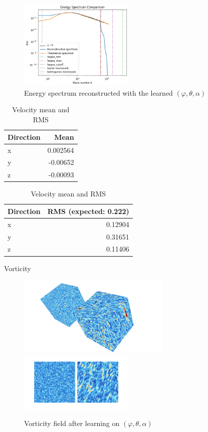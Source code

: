 \documentclass[11pt]{beamer}
\begin{document}
\begin{frame}
  \begin{figure}
    \centering
    \includegraphics[width=0.49\textwidth]{illustrations/EnergySpectrumTrained.png}
    \caption{Energy spectrum reconstructed with the learned $(\varphi,\theta,\alpha)$}
  \end{figure}

   \begin{table}
    \centering
    \begin{tabular}{lr}
      \toprule
      \textbf{Direction} & \textbf{Mean} \\
      \midrule
      x & 0.002564 \\
      y & -0.00652 \\
      z & -0.00093 \\
      \bottomrule
    \end{tabular}
    \qquad
    \begin{tabular}{lr}
      \toprule
      \textbf{Direction} & \textbf{RMS (expected: 0.222)} \\
      \midrule
      x & 0.12904 \\
      y & 0.31651 \\
      z & 0.11406 \\
      \bottomrule
    \end{tabular}
    \caption{Velocity mean and RMS}
  \end{table}
\end{frame}

\begin{frame}{Vorticity}
  \begin{figure}
    \centering
    \includegraphics[width=0.65\textwidth]{illustrations/vorticity.png}
    \includegraphics[width=0.49\textwidth]{illustrations/vorticity-cutplane.png}
    \caption{Vorticity field after learning on $(\varphi,\theta,\alpha)$}
  \end{figure}
\end{frame}
\end{document}

